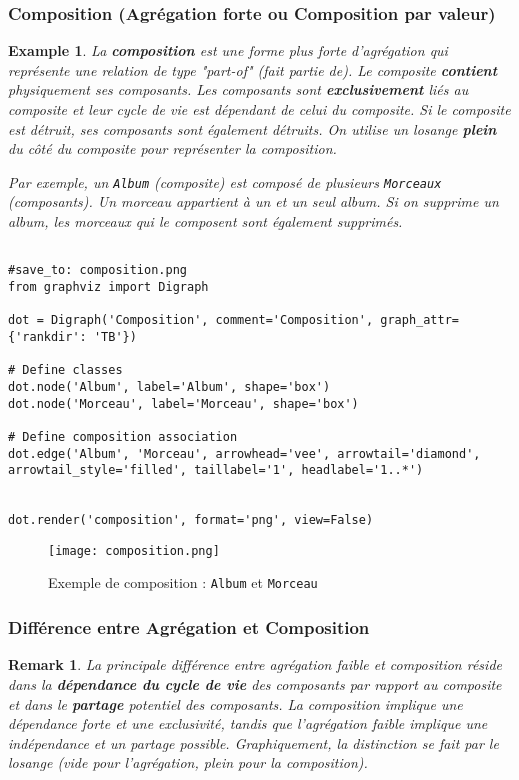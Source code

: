\documentclass{article}
\newtheorem{remark}{Remark}
\newtheorem{example}{Example}
\begin{document}
\subsubsection{Composition (Agrégation forte ou Composition par valeur)}
\begin{example}
La \textbf{composition} est une forme plus forte d'agrégation qui représente une relation de type "part-of" (fait partie de).  Le composite \textbf{contient} physiquement ses composants. Les composants sont \textbf{exclusivement} liés au composite et leur cycle de vie est dépendant de celui du composite. Si le composite est détruit, ses composants sont également détruits. On utilise un losange \textbf{plein} du côté du composite pour représenter la composition.

Par exemple, un \texttt{Album} (composite) est composé de plusieurs \texttt{Morceaux} (composants). Un morceau appartient à un et un seul album. Si on supprime un album, les morceaux qui le composent sont également supprimés.
\end{example}

\begin{verbatim}

#save_to: composition.png
from graphviz import Digraph

dot = Digraph('Composition', comment='Composition', graph_attr={'rankdir': 'TB'})

# Define classes
dot.node('Album', label='Album', shape='box')
dot.node('Morceau', label='Morceau', shape='box')

# Define composition association
dot.edge('Album', 'Morceau', arrowhead='vee', arrowtail='diamond', arrowtail_style='filled', taillabel='1', headlabel='1..*')


dot.render('composition', format='png', view=False)
\end{verbatim}

\begin{figure}[h]
    \centering
    \texttt{[image: composition.png]}
    \caption{Exemple de composition : \texttt{Album} et \texttt{Morceau}}
    \label{fig:composition}
\end{figure}

\subsubsection{Différence entre Agrégation et Composition}
\begin{remark}
La principale différence entre agrégation faible et composition réside dans la \textbf{dépendance du cycle de vie} des composants par rapport au composite et dans le \textbf{partage} potentiel des composants. La composition implique une dépendance forte et une exclusivité, tandis que l'agrégation faible implique une indépendance et un partage possible. Graphiquement, la distinction se fait par le losange (vide pour l'agrégation, plein pour la composition).
\end{remark}
\end{document}
